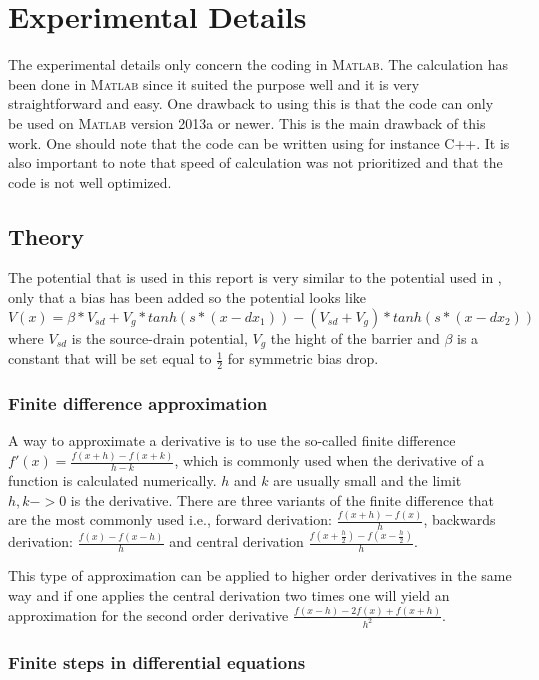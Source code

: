 \documentclass[a4paper]{article}
\begin{document}
\section{Experimental Details}
The experimental details only concern the coding in \textsc{Matlab}.
The calculation has been done in \textsc{Matlab} since it suited the purpose well and it is very straightforward and easy.
One drawback to using this is that the code can only be used on \textsc{Matlab} version 2013a or newer.
This is the main drawback of this work. One should note that the code can be written using for instance C++.
It is also important to note that speed of calculation was not prioritized and that the code is not well optimized.

\subsection{Theory}
The potential that is used in this report is very similar to the potential used in \cite{5}, only that a bias has been added so the potential looks like \begin{equation}
\label{potential}
V(x) = \beta*V_{sd}+V_{g}*tanh(s*(x-dx_{1}))-(V_{sd}+V_{g})*tanh(s*(x-dx_{2}))
\end{equation}
where $V_{sd}$ is the source-drain potential, $V_{g}$ the hight of the barrier and $\beta$ is a constant that will be set equal to $\frac{1}{2}$ for symmetric bias drop.
\subsubsection{Finite difference approximation}
A way to approximate a derivative is to use the so-called finite difference $f'(x) =\frac{f(x+h)-f(x+k)}{h-k}$, which is commonly used when the derivative of a function is calculated numerically. $h$ and $k$ are usually small and the limit $h,k->0$ is the derivative.
There are three variants of the finite difference that are the most commonly used i.e., forward derivation: $\frac{f(x+h)-f(x)}{h}$, backwards derivation: $\frac{f(x)-f(x-h)}{h}$ and central derivation $\frac{f(x+\frac{h}{2})-f(x-\frac{h}{2})}{h}$.

This type of approximation can be applied to higher order derivatives in the same way and if one applies the central derivation two times one will yield an approximation for the second order derivative $\frac{f(x-h)- 2f(x) +f(x+h)}{h^2}$.

\subsubsection{Finite steps in differential equations}
\end{document}
